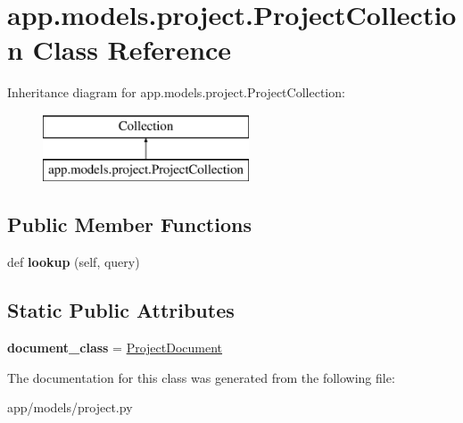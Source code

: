 \hypertarget{classapp_1_1models_1_1project_1_1_project_collection}{}\section{app.\+models.\+project.\+Project\+Collection Class Reference}
\label{classapp_1_1models_1_1project_1_1_project_collection}
Inheritance diagram for app.\+models.\+project.\+Project\+Collection\+:\begin{figure}[H]
\begin{center}
\leavevmode
\includegraphics[height=2.000000cm]{classapp_1_1models_1_1project_1_1_project_collection}
\end{center}
\end{figure}
\subsection*{Public Member Functions}
\begin{DoxyCompactItemize}
\item 
\mbox{\label{classapp_1_1models_1_1project_1_1_project_collection_a2ef83627e61ebddcbb29d393360d7362}} 
def {\bfseries lookup} (self, query)
\end{DoxyCompactItemize}
\subsection*{Static Public Attributes}
\begin{DoxyCompactItemize}
\item 
\mbox{\label{classapp_1_1models_1_1project_1_1_project_collection_a35bc7ec5eeea74182fae7f62b09b0d5c}} 
{\bfseries document\+\_\+class} = \hyperlink{classapp_1_1models_1_1project_1_1_project_document}{Project\+Document}
\end{DoxyCompactItemize}


The documentation for this class was generated from the following file\+:\begin{DoxyCompactItemize}
\item 
app/models/project.\+py\end{DoxyCompactItemize}
